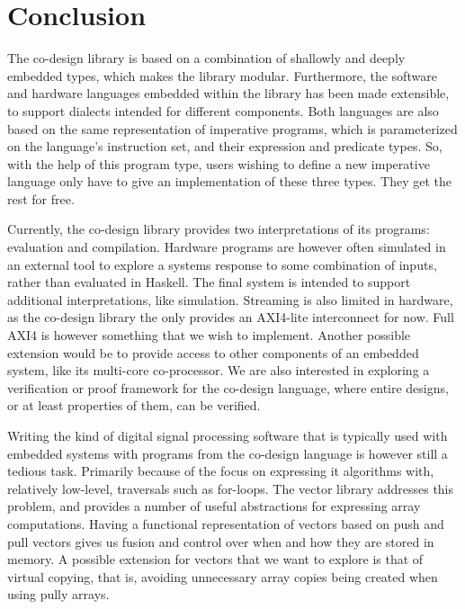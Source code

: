 \documentclass[../paper.tex]{subfiles}
\begin{document}
\section{Conclusion}
\label{conc}

The co-design library is based on a combination of shallowly and deeply embedded types, which makes the library modular. Furthermore, the software and hardware languages embedded within the library has been made extensible, to support dialects intended for different components. Both languages are also based on the same representation of imperative programs, which is parameterized on the language's instruction set, and their expression and predicate types. So, with the help of this program type, users wishing to define a new imperative language only have to give an implementation of these three types. They get the rest for free.


Currently, the co-design library provides two interpretations of its programs: evaluation and compilation. Hardware programs are however often simulated in an external tool to explore a systems response to some combination of inputs, rather than evaluated in Haskell. The final system is intended to support additional interpretations, like simulation. Streaming is also limited in hardware, as the co-design library the only provides an AXI4-lite interconnect for now. Full AXI4 is however something that we wish to implement. Another possible extension would be to provide access to other components of an embedded system, like its multi-core co-processor. We are also interested in exploring a verification or proof framework for the co-design language, where entire designs, or at least properties of them, can be verified.

Writing the kind of digital signal processing software that is typically used with embedded systems with programs from the co-design language is however still a tedious task. Primarily because of the focus on expressing it algorithms with, relatively low-level, traversals such as for-loops. The vector library addresses this problem, and provides a number of useful abstractions for expressing array computations. Having a functional representation of vectors based on push and pull vectors gives us fusion and control over when and how they are stored in memory. A possible extension for vectors that we want to explore is that of virtual copying, that is, avoiding unnecessary array copies being created when using pully arrays.
\end{document}
